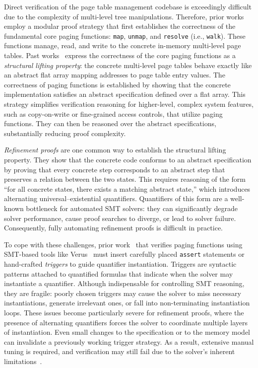 Direct verification of the page table management codebase is exceedingly difficult due to the complexity of multi-level tree manipulations. Therefore, prior works~\cite{li:ieeesp2021,brun23hotos,li:sekvm:usenix21} employ a modular proof strategy that first establishes the correctness of the fundamental core paging functions: \texttt{map}, \texttt{unmap}, and \texttt{resolve} (i.e., \texttt{walk}). These functions manage, read, and write to the concrete in-memory multi-level page tables. Past works~\cite{li:ieeesp2021,brun23hotos,li:sekvm:usenix21} express the correctness of the core paging functions as a \textit{structural lifting property}: the concrete multi-level page tables behave exactly like an abstract flat array mapping addresses to page table entry values. 
The correctness of paging functions is established by showing that the concrete implementation satisfies an abstract specification defined over a flat array. This strategy simplifies verification reasoning for higher-level, complex system features, such as copy-on-write or fine-grained access controls, that utilize paging functions. They can then be reasoned over the abstract specifications, substantially reducing proof complexity. 

\emph{Refinement proofs} are one common way to establish the structural lifting property. They show that the concrete code conforms to an abstract specification by proving that every concrete step corresponds to an abstract step that preserves a relation between the two states. This requires reasoning of the form “for all concrete states, there exists a matching abstract state,” which introduces alternating universal–existential quantifiers. Quantifiers of this form are a well-known bottleneck for automated SMT solvers: they can significantly degrade solver performance, cause proof searches to diverge, or lead to solver failure. Consequently, fully automating refinement proofs is difficult in practice.

To cope with these challenges, prior work~\cite{brun23hotos,atmosphere2025sosp,Brun2022VerifiedPaging} that verifies paging functions using SMT-based tools like Verus~\cite{verus} must insert carefully placed \texttt{assert} statements or hand-crafted \emph{triggers} to guide quantifier instantiation. Triggers are syntactic patterns attached to quantified formulas that indicate when the solver may instantiate a quantifier. Although indispensable for controlling SMT reasoning, they are fragile: poorly chosen triggers may cause the solver to miss necessary instantiations, generate irrelevant ones, or fall into non-terminating instantiation loops. These issues become particularly severe for refinement proofs, where the presence of alternating quantifiers forces the solver to coordinate multiple layers of instantiation. Even small changes to the specification or to the memory model can invalidate a previously working trigger strategy. As a result, extensive manual tuning is required, and verification may still fail due to the solver's inherent limitations~\cite{Brun2022VerifiedPaging}. 

